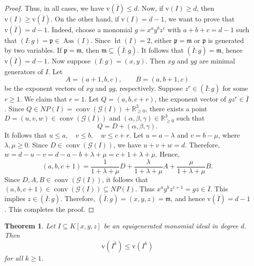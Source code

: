 \documentclass[11pt,reqno,a4paper]{amsart}
\newtheorem{theorem}{Theorem}[section]
\theoremstyle{definition}
\begin{document}
\begin{proof}
\noindent Thus, in all cases, we have \(\mathrm{v}(\overline{I}) \le d\). Now, if \(\mathrm{v}(I) \ge d\), then \(\mathrm{v}(I) \ge \mathrm{v}(\overline{I})\). On the other hand, if \(\mathrm{v}(I) = d - 1\), we want to prove that \(\mathrm{v}(\overline{I}) = d - 1\). Indeed, choose a monomial \(g = x^a y^b z^c\) with \(a + b + c = d - 1\) such that \((I : g) = \mathfrak{p} \in \operatorname{Ass}(I)\). Since \(\operatorname{ht}(I) = 2\), either \(\mathfrak{p} = \mathfrak{m}\) or \(\mathfrak{p}\) is generated by two variables. If \(\mathfrak{p} = \mathfrak{m}\), then \(\mathfrak{m} \subseteq (\overline{I} : g)\). It follows that \((\overline{I} : g) = \mathfrak{m}\), hence \(\mathrm{v}(\overline{I}) = d - 1\).
\noindent Now suppose \((I : g) = (x, y)\). Then \(xg\) and \(yg\) are minimal generators of \(I\). Let
\[
A = (a+1, b, c), \qquad B = (a, b+1, c)
\]
be the exponent vectors of \(xg\) and \(yg\), respectively. Suppose \(z^r \in (\overline{I} : g)\) for some \(r \ge 1\). We claim that \(r = 1\). Let \(Q = (a, b, c + r)\), the exponent vector of \(g z^r \in \overline{I}\). Since \(Q \in NP(I) = \operatorname{conv}(\mathcal{G}(I)) + \mathbb{R}_{\ge 0}^3\), there exists a point \(D = (u, v, w) \in \operatorname{conv}(\mathcal{G}(I))\) and \((\alpha, \beta, \gamma) \in \mathbb{R}_{\ge 0}^3\) such that
\[
Q = D + (\alpha, \beta, \gamma).
\]
It follows that
\(
u \le a, \quad v \le b, \quad w \le c + r.
\)
Let \(u = a - \lambda\) and \(v = b - \mu\), where \(\lambda, \mu \ge 0\). Since \(D \in \operatorname{conv}(\mathcal{G}(I))\), we have \(u + v + w = d\). Therefore,
\(
w = d - u - v = d - a - b + \lambda + \mu = c + 1 + \lambda + \mu.
\)
Hence,
\[
(a, b, c+1) = \frac{1}{1 + \lambda + \mu} D + \frac{\lambda}{1 + \lambda + \mu} A + \frac{\mu}{1 + \lambda + \mu} B.
\]
Since \(D, A, B \in \operatorname{conv}(\mathcal{G}(I))\), it follows that \((a, b, c+1) \in \operatorname{conv}(\mathcal{G}(I)) \subseteq NP(I)\). Thus \(x^a y^b z^{c+1} = gz \in \overline{I}\). This implies \(z \in (\overline{I} : g)\). Therefore, \((\overline{I} : g) = (x, y, z) = \mathfrak{m}\), and hence \(\mathrm{v}(\overline{I}) = d - 1\). This completes the proof.



\end{proof}






\begin{theorem}
\label{thm:main-bound}
Let \(I \subseteq K[x,y,z]\) be an equigenerated monomial ideal in degree \(d\). Then
\[
\mathrm{v}(\overline{I^k}) \le \mathrm{v}(I^k)
\]
for all \(k \ge 1\).
\end{theorem}
\end{document}
